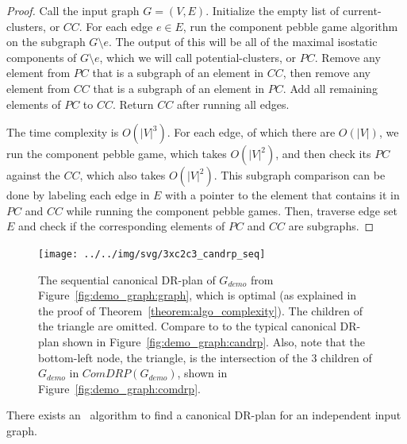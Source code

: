 \begin{proof}
    Call the input graph $G=(V,E)$. Initialize the empty list of current-clusters, or $CC$. For each edge $e\in E$, run the component pebble game algorithm \cite{Jacobs:1997:PG} on the subgraph $G\setminus e$. The output of this will be all of the maximal isostatic components of $G\setminus e$, which we will call potential-clusters, or $PC$. Remove any element from $PC$ that is a subgraph of an element in $CC$, then remove any element from $CC$ that is a subgraph of an element in $PC$. Add all remaining elements of $PC$ to $CC$. Return $CC$ after running all edges.

    The time complexity is $O(|V|^3)$. For each edge, of which there are $O(|V|)$, we run the component pebble game, which takes $O(|V|^2)$, and then check its $PC$ against the $CC$, which also takes $O(|V|^2)$. This subgraph comparison can be done by labeling each edge in $E$ with a pointer to the element that contains it in $PC$ and $CC$ while running the component pebble games. Then, traverse edge set $E$ and check if the corresponding elements of $PC$ and $CC$ are subgraphs.
\end{proof}

\begin{figure}\centering%
  \texttt{[image: ../../img/svg/3xc2c3\_candrp\_seq]}
  \caption{The sequential canonical DR-plan of $G_{demo}$ from Figure~\ref{fig:demo_graph:graph}, which is optimal (as explained in the proof of Theorem~\ref{theorem:algo_complexity}). The children of the triangle are omitted. Compare to to the typical canonical DR-plan shown in Figure~\ref{fig:demo_graph:candrp}. Also, note that the bottom-left node, the triangle, is the intersection of the 3 children of $G_{demo}$ in $ComDRP(G_{demo})$, shown in Figure~\ref{fig:demo_graph:comdrp}.}
  \label{fig:demo_graph:candrpseq}
\end{figure}%

\begin{theorem}\label{theorem:algo_complexity}
    There exists an \ComplexityCanDRPV\ algorithm to find a canonical DR-plan for an independent input graph.
\end{theorem}

